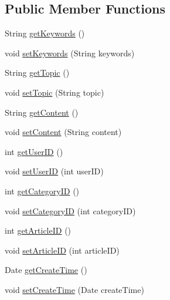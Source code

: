 \subsection*{Public Member Functions}
\begin{DoxyCompactItemize}
\item 
String \hyperlink{classcom_1_1github_1_1walterfan_1_1gtd_1_1model_1_1Article_a4650ebf856f53b5197324a67e1684b41}{get\-Keywords} ()
\item 
void \hyperlink{classcom_1_1github_1_1walterfan_1_1gtd_1_1model_1_1Article_a37a35e568e1211352ab4aee01efc2850}{set\-Keywords} (String keywords)
\item 
String \hyperlink{classcom_1_1github_1_1walterfan_1_1gtd_1_1model_1_1Article_a3a75e72a454b1027a456f7d09adf7841}{get\-Topic} ()
\item 
void \hyperlink{classcom_1_1github_1_1walterfan_1_1gtd_1_1model_1_1Article_af54797f3f70167cf81199d6ddb3abd6d}{set\-Topic} (String topic)
\item 
String \hyperlink{classcom_1_1github_1_1walterfan_1_1gtd_1_1model_1_1Article_a817c646f979cf5e6459f24bbdc815569}{get\-Content} ()
\item 
void \hyperlink{classcom_1_1github_1_1walterfan_1_1gtd_1_1model_1_1Article_a2dc8128e159ea5202a9a6cfa7c92ac9c}{set\-Content} (String content)
\item 
int \hyperlink{classcom_1_1github_1_1walterfan_1_1gtd_1_1model_1_1Article_a72a6a6682a8a6c101b0d3ebc822a7c8d}{get\-User\-I\-D} ()
\item 
void \hyperlink{classcom_1_1github_1_1walterfan_1_1gtd_1_1model_1_1Article_a2258f8798d107e9fb7bb8eb20542c9af}{set\-User\-I\-D} (int user\-I\-D)
\item 
int \hyperlink{classcom_1_1github_1_1walterfan_1_1gtd_1_1model_1_1Article_ae2fdd0a0677ec8c432074a35dec2bae7}{get\-Category\-I\-D} ()
\item 
void \hyperlink{classcom_1_1github_1_1walterfan_1_1gtd_1_1model_1_1Article_ac3439300f13e7541de8ccc5a326ad6e0}{set\-Category\-I\-D} (int category\-I\-D)
\item 
int \hyperlink{classcom_1_1github_1_1walterfan_1_1gtd_1_1model_1_1Article_ab897bba6f41a799cae31f5208910c526}{get\-Article\-I\-D} ()
\item 
void \hyperlink{classcom_1_1github_1_1walterfan_1_1gtd_1_1model_1_1Article_a2b08cb4a33bf65e3751e1f20fc1816bf}{set\-Article\-I\-D} (int article\-I\-D)
\item 
Date \hyperlink{classcom_1_1github_1_1walterfan_1_1gtd_1_1model_1_1Article_a7dc311a5adcb38f8e1bfce3e8d012671}{get\-Create\-Time} ()
\item 
void \hyperlink{classcom_1_1github_1_1walterfan_1_1gtd_1_1model_1_1Article_aa27ee0b3fb32c1e00942b7c7da479b74}{set\-Create\-Time} (Date create\-Time)
\end{DoxyCompactItemize}
